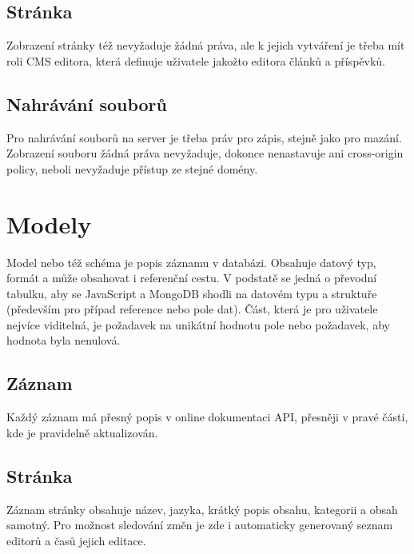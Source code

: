 \subsection{Stránka}
Zobrazení stránky též nevyžaduje žádná práva, ale k jejich vytváření je třeba mít roli CMS editora, která
definuje uživatele jakožto editora článků a příspěvků.

\subsection{Nahrávání souborů}
Pro nahrávání souborů na server je třeba práv pro zápis, stejně jako pro mazání.
Zobrazení souboru žádná práva nevyžaduje, dokonce nenastavuje ani cross-origin policy, neboli
nevyžaduje přístup ze stejné domény.

\section{Modely}
Model nebo též schéma je popis záznamu v databázi. Obsahuje datový typ, formát a může obsahovat i
referenční cestu. V podstatě se jedná o převodní tabulku, aby se JavaScript a MongoDB shodli na datovém typu a
struktuře (především pro případ reference nebo pole dat). Část, která je pro uživatele nejvíce viditelná, je 
požadavek na unikátní hodnotu pole nebo požadavek, aby hodnota byla nenulová.
\subsection{Záznam} 
Každý záznam má přesný popis v online dokumentaci API, přesněji v pravé části, kde je pravidelně aktualizován.
\subsection{Stránka}
Záznam stránky obsahuje název, jazyka, krátký popis obsahu, kategorii a obsah samotný.
Pro možnost sledování změn je zde i automaticky generovaný seznam editorů a časů jejich editace.
